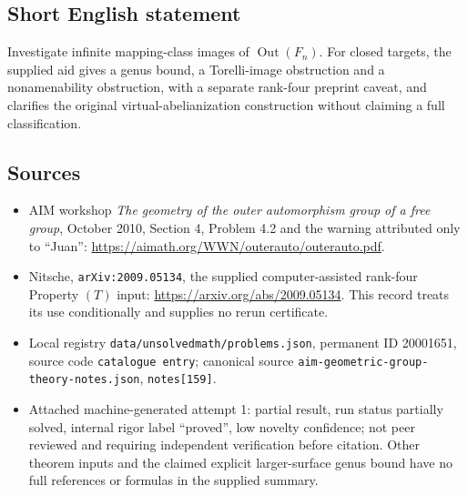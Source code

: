\documentclass[11pt]{article}
\begin{document}
\subsection{Short English statement}
Investigate infinite mapping-class images of \(\operatorname{Out}(F_n)\). For closed targets, the supplied aid gives a genus bound, a Torelli-image obstruction and a nonamenability obstruction, with a separate rank-four preprint caveat, and clarifies the original virtual-abelianization construction without claiming a full classification.
\subsection{Sources}
\begin{itemize}
\item AIM workshop \emph{The geometry of the outer automorphism group of a free group}, October 2010, Section 4, Problem 4.2 and the warning attributed only to ``Juan'': \url{https://aimath.org/WWN/outerauto/outerauto.pdf}.
\item Nitsche, \texttt{arXiv:2009.05134}, the supplied computer-assisted rank-four Property \((T)\) input: \url{https://arxiv.org/abs/2009.05134}. This record treats its use conditionally and supplies no rerun certificate.
\item Local registry \texttt{data/unsolvedmath/problems.json}, permanent ID 20001651, source code \texttt{catalogue entry}; canonical source \texttt{aim-geometric-group-theory-notes.json}, \texttt{notes[159]}.
\item Attached machine-generated attempt 1: partial result, run status partially solved, internal rigor label ``proved'', low novelty confidence; not peer reviewed and requiring independent verification before citation. Other theorem inputs and the claimed explicit larger-surface genus bound have no full references or formulas in the supplied summary.
\end{itemize}
\end{document}
